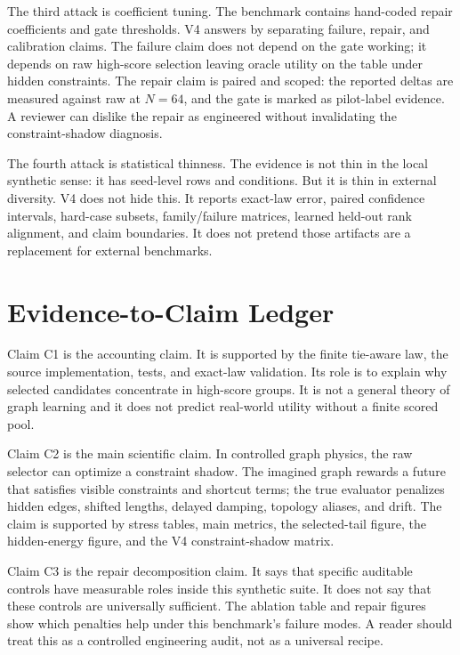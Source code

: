 \documentclass{article}
\begin{document}
The third attack is coefficient tuning.  The benchmark contains hand-coded
repair coefficients and gate thresholds.  V4 answers by separating failure,
repair, and calibration claims.  The failure claim does not depend on the gate
working; it depends on raw high-score selection leaving oracle utility on the
table under hidden constraints.  The repair claim is paired and scoped: the
reported deltas are measured against raw at \(N=64\), and the gate is marked as
pilot-label evidence.  A reviewer can dislike the repair as engineered without
invalidating the constraint-shadow diagnosis.

The fourth attack is statistical thinness.  The evidence is not thin in the
local synthetic sense: it has \VFourGraphSeedRows{} seed-level rows and
\VFourGraphConditions{} conditions.  But it is thin in external diversity.  V4
does not hide this.  It reports exact-law error, paired confidence intervals,
hard-case subsets, family/failure matrices, learned held-out rank alignment, and
claim boundaries.  It does not pretend those artifacts are a replacement for
external benchmarks.

\section{Evidence-to-Claim Ledger}

Claim C1 is the accounting claim.  It is supported by the finite tie-aware law,
the source implementation, tests, and exact-law validation.  Its role is to
explain why selected candidates concentrate in high-score groups.  It is not a
general theory of graph learning and it does not predict real-world utility
without a finite scored pool.

Claim C2 is the main scientific claim.  In controlled graph physics, the raw
selector can optimize a constraint shadow.  The imagined graph rewards a future
that satisfies visible constraints and shortcut terms; the true evaluator
penalizes hidden edges, shifted lengths, delayed damping, topology aliases, and
drift.  The claim is supported by stress tables, main metrics, the selected-tail
figure, the hidden-energy figure, and the V4 constraint-shadow matrix.

Claim C3 is the repair decomposition claim.  It says that specific auditable
controls have measurable roles inside this synthetic suite.  It does not say
that these controls are universally sufficient.  The ablation table and repair
figures show which penalties help under this benchmark's failure modes.  A
reader should treat this as a controlled engineering audit, not as a universal
recipe.
\end{document}
